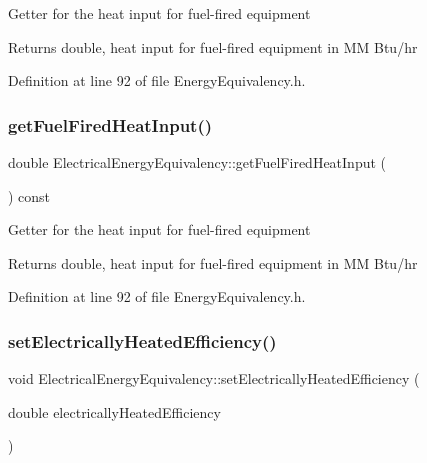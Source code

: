 Getter for the heat input for fuel-\/fired equipment

\begin{DoxyReturn}{Returns}
double, heat input for fuel-\/fired equipment in MM Btu/hr 
\end{DoxyReturn}


Definition at line 92 of file Energy\+Equivalency.\+h.

\mbox{\label{class_electrical_energy_equivalency_acb07f4cd7d416922bc355b2f1b3aadb4}} 
\subsubsection{\texorpdfstring{get\+Fuel\+Fired\+Heat\+Input()}{getFuelFiredHeatInput()}\hspace{0.1cm}{\footnotesize\ttfamily [3/3]}}
{\footnotesize\ttfamily double Electrical\+Energy\+Equivalency\+::get\+Fuel\+Fired\+Heat\+Input (\begin{DoxyParamCaption}{ }\end{DoxyParamCaption}) const\hspace{0.3cm}{\ttfamily [inline]}}

Getter for the heat input for fuel-\/fired equipment

\begin{DoxyReturn}{Returns}
double, heat input for fuel-\/fired equipment in MM Btu/hr 
\end{DoxyReturn}


Definition at line 92 of file Energy\+Equivalency.\+h.

\mbox{\label{class_electrical_energy_equivalency_ab9091e720096a4c088cece14e975ccb4}} 
\subsubsection{\texorpdfstring{set\+Electrically\+Heated\+Efficiency()}{setElectricallyHeatedEfficiency()}\hspace{0.1cm}{\footnotesize\ttfamily [1/3]}}
{\footnotesize\ttfamily void Electrical\+Energy\+Equivalency\+::set\+Electrically\+Heated\+Efficiency (\begin{DoxyParamCaption}\item[{double}]{electrically\+Heated\+Efficiency }\end{DoxyParamCaption})\hspace{0.3cm}{\ttfamily [inline]}}

